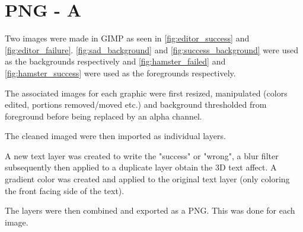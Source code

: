 \documentclass[a4paper]{article}
\begin{document}
\section{PNG - A}

Two images were made in GIMP as seen in \ref{fig:editor_success} and \ref{fig:editor_failure}.
\ref{fig:sad_background} and \ref{fig:success_background} were used as the backgrounds respectively and \ref{fig:hamster_failed} and \ref{fig:hamster_success} were used as the foregrounds respectively.

The associated images for each graphic were first resized, manipulated (colors edited, portions removed/moved etc.) and background thresholded from foreground before being replaced by an alpha channel.

The cleaned imaged were then imported as individual layers.

A new text layer was created to write the "success" or "wrong", a blur filter subsequently then applied to a duplicate layer obtain the 3D text affect.
A gradient color was created and applied to the original text layer (only coloring the front facing side of the text).

The layers were then combined and exported as a PNG.
This was done for each image.
\end{document}
